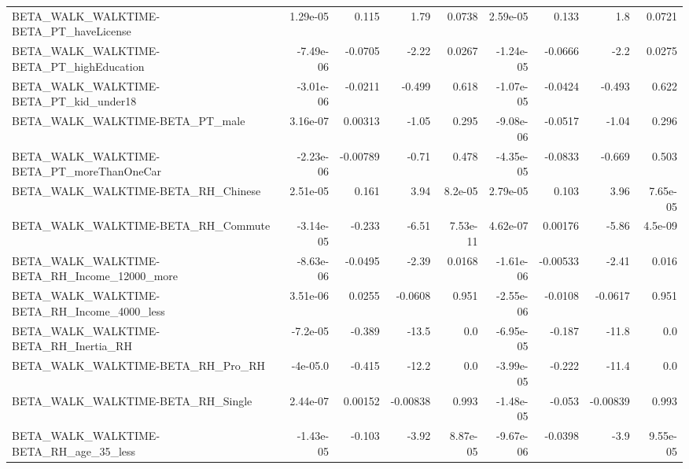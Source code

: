 \begin{tabular}{lrrrrrrrr}
BETA\_WALK\_WALKTIME-BETA\_PT\_haveLicense             &    1.29e-05 &        0.115 &     1.79 &   0.0738 &   2.59e-05 &       0.133 &          1.8 &        0.0721 \\
BETA\_WALK\_WALKTIME-BETA\_PT\_highEducation           &   -7.49e-06 &      -0.0705 &    -2.22 &   0.0267 &  -1.24e-05 &     -0.0666 &         -2.2 &        0.0275 \\
BETA\_WALK\_WALKTIME-BETA\_PT\_kid\_under18             &   -3.01e-06 &      -0.0211 &   -0.499 &    0.618 &  -1.07e-05 &     -0.0424 &       -0.493 &         0.622 \\
BETA\_WALK\_WALKTIME-BETA\_PT\_male                    &    3.16e-07 &      0.00313 &    -1.05 &    0.295 &  -9.08e-06 &     -0.0517 &        -1.04 &         0.296 \\
BETA\_WALK\_WALKTIME-BETA\_PT\_moreThanOneCar          &   -2.23e-06 &     -0.00789 &    -0.71 &    0.478 &  -4.35e-05 &     -0.0833 &       -0.669 &         0.503 \\
BETA\_WALK\_WALKTIME-BETA\_RH\_Chinese                 &    2.51e-05 &        0.161 &     3.94 &  8.2e-05 &   2.79e-05 &       0.103 &         3.96 &      7.65e-05 \\
BETA\_WALK\_WALKTIME-BETA\_RH\_Commute                 &   -3.14e-05 &       -0.233 &    -6.51 & 7.53e-11 &   4.62e-07 &     0.00176 &        -5.86 &       4.5e-09 \\
BETA\_WALK\_WALKTIME-BETA\_RH\_Income\_12000\_more       &   -8.63e-06 &      -0.0495 &    -2.39 &   0.0168 &  -1.61e-06 &    -0.00533 &        -2.41 &         0.016 \\
BETA\_WALK\_WALKTIME-BETA\_RH\_Income\_4000\_less        &    3.51e-06 &       0.0255 &  -0.0608 &    0.951 &  -2.55e-06 &     -0.0108 &      -0.0617 &         0.951 \\
BETA\_WALK\_WALKTIME-BETA\_RH\_Inertia\_RH              &    -7.2e-05 &       -0.389 &    -13.5 &      0.0 &  -6.95e-05 &      -0.187 &        -11.8 &           0.0 \\
BETA\_WALK\_WALKTIME-BETA\_RH\_Pro\_RH                  &    -4e-05.0 &       -0.415 &    -12.2 &      0.0 &  -3.99e-05 &      -0.222 &        -11.4 &           0.0 \\
BETA\_WALK\_WALKTIME-BETA\_RH\_Single                  &    2.44e-07 &      0.00152 & -0.00838 &    0.993 &  -1.48e-05 &      -0.053 &     -0.00839 &         0.993 \\
BETA\_WALK\_WALKTIME-BETA\_RH\_age\_35\_less             &   -1.43e-05 &       -0.103 &    -3.92 & 8.87e-05 &  -9.67e-06 &     -0.0398 &         -3.9 &      9.55e-05 \\

\end{tabular}
